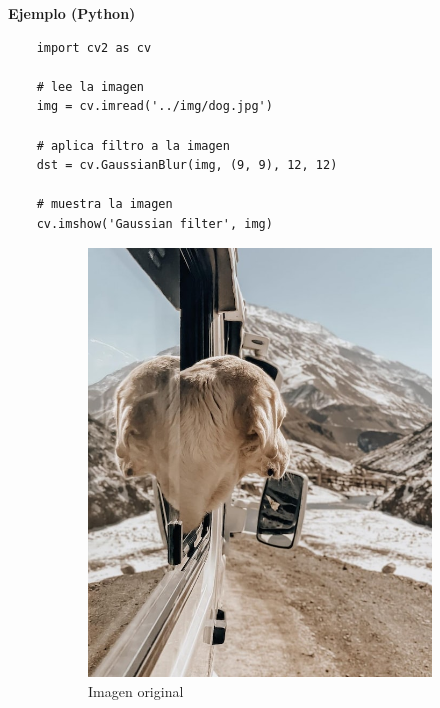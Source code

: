 \documentclass[a4paper, 12pt]{article}
\begin{document}
\textbf{Ejemplo (Python)}

\begin{lstlisting}
    import cv2 as cv

    # lee la imagen
    img = cv.imread('../img/dog.jpg')

    # aplica filtro a la imagen
    dst = cv.GaussianBlur(img, (9, 9), 12, 12)

    # muestra la imagen
    cv.imshow('Gaussian filter', img)
\end{lstlisting}

\begin{figure}[!ht]
    \centering
    \begin{subfigure}{0.4\textwidth}
        \includegraphics[width=\textwidth]{img/dog.jpg}
        \caption{Imagen original}
    \end{subfigure}
    \begin{subfigure}{0.4\textwidth}

\end{subfigure}
\end{figure}
\end{document}
